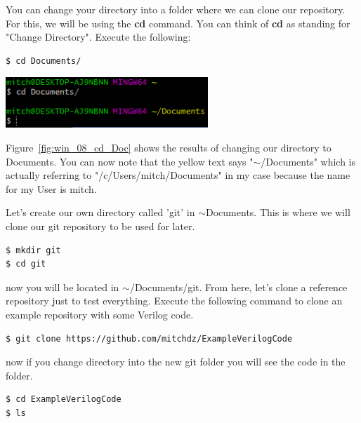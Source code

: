 \documentclass[12pt]{article}
\begin{document}
You can change your directory into a folder where we can clone our repository. For this, we will be using the \textbf{cd} command. You can think of \textbf{cd} as standing for "Change Directory". Execute the following:

\begin{lstlisting}
$ cd Documents/
\end{lstlisting}

\begin{center}
    \includegraphics[width=3in]{win_08_cd_Doc.PNG}
    \label{fig:win_08_cd_Doc}
\end{center}

Figure~\ref{fig:win_08_cd_Doc} shows the results of changing our directory to Documents. You can now note that the yellow text says "$\sim$/Documents" which is actually referring to "/c/Users/mitch/Documents" in my case because the name for my User is mitch.

Let's create our own directory called 'git' in $\sim$Documents. This is where we will clone our git repository to be used for later.

\begin{lstlisting}
$ mkdir git
$ cd git
\end{lstlisting}

now you will be located in $\sim$/Documents/git. From here, let's clone a reference repository just to test everything. Execute the following command to clone an example repository with some Verilog code.

\begin{lstlisting}
$ git clone https://github.com/mitchdz/ExampleVerilogCode
\end{lstlisting}

now if you change directory into the new git folder you will see the code in the folder.

\begin{lstlisting}
$ cd ExampleVerilogCode
$ ls
\end{lstlisting}
\end{document}
